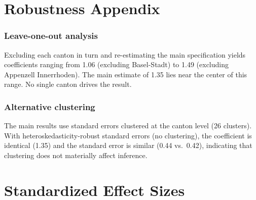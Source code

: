 \documentclass[12pt]{article}
\begin{document}
\section{Robustness Appendix}

\subsubsection*{Leave-one-out analysis} Excluding each canton in turn and re-estimating the main specification yields coefficients ranging from 1.06 (excluding Basel-Stadt) to 1.49 (excluding Appenzell Innerrhoden). The main estimate of 1.35 lies near the center of this range. No single canton drives the result.

\subsubsection*{Alternative clustering} The main results use standard errors clustered at the canton level (26 clusters). With heteroskedasticity-robust standard errors (no clustering), the coefficient is identical (1.35) and the standard error is similar (0.44 vs.\ 0.42), indicating that clustering does not materially affect inference.

\section{Standardized Effect Sizes}
\label{sec:sde}


\end{document}
